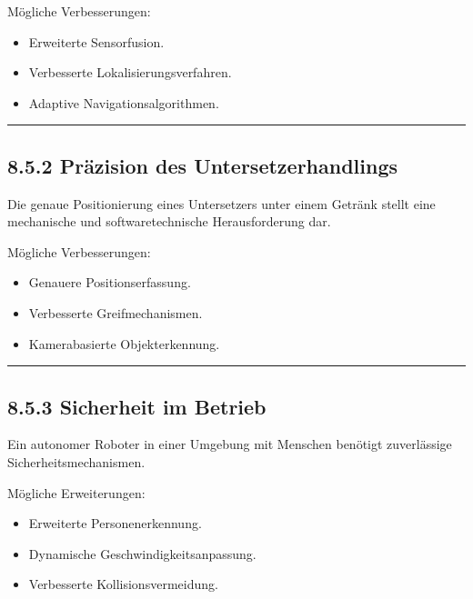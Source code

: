 \documentclass[
  a4paper,
  12pt,
  DIV=12,        %
  parskip=half,  %
  headings=small %
]{scrartcl}
\theoremstyle{definition}
\providecommand{\tightlist}{%
  \setlength{\itemsep}{0pt}\setlength{\parskip}{0pt}}
\theoremstyle{definition}
\providecommand{\tightlist}{%
  \setlength{\itemsep}{0pt}\setlength{\parskip}{0pt}}
\begin{document}
Mögliche Verbesserungen:

\begin{itemize}
\tightlist
\item
  Erweiterte Sensorfusion.
\item
  Verbesserte Lokalisierungsverfahren.
\item
  Adaptive Navigationsalgorithmen.
\end{itemize}

\begin{center}\rule{0.5\linewidth}{0.5pt}\end{center}

\subsection{8.5.2 Präzision des
Untersetzerhandlings}\label{pruxe4zision-des-untersetzerhandlings}

Die genaue Positionierung eines Untersetzers unter einem Getränk stellt
eine mechanische und softwaretechnische Herausforderung dar.

Mögliche Verbesserungen:

\begin{itemize}
\tightlist
\item
  Genauere Positionserfassung.
\item
  Verbesserte Greifmechanismen.
\item
  Kamerabasierte Objekterkennung.
\end{itemize}

\begin{center}\rule{0.5\linewidth}{0.5pt}\end{center}

\subsection{8.5.3 Sicherheit im Betrieb}\label{sicherheit-im-betrieb}

Ein autonomer Roboter in einer Umgebung mit Menschen benötigt
zuverlässige Sicherheitsmechanismen.

Mögliche Erweiterungen:

\begin{itemize}
\tightlist
\item
  Erweiterte Personenerkennung.
\item
  Dynamische Geschwindigkeitsanpassung.
\item
  Verbesserte Kollisionsvermeidung.
\end{itemize}
\end{document}
